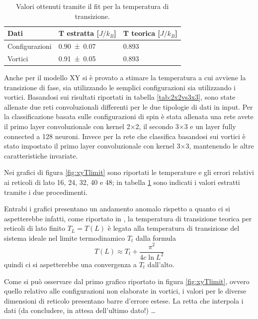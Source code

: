 \documentclass{article}
\begin{document}
\begin{table}[!ht]
\begin{center}
\begin{tabular}{lll}
\toprule
Dati & T estratta [$J/k_B$] & T teorica [$J/k_B$] \\
\midrule
Configurazioni & \num{0.90 \pm 0.07} & \num{0.893}\\
Vortici & \num{0.91 \pm0.05}  & \num{0.893} \\
\bottomrule
\end{tabular}
\end{center}
\caption{Valori ottenuti tramite il fit per la temperatura di transizione.}
\label{tab:Txy}
\end{table}

Anche per il modello XY si è provato a stimare la temperatura a cui avviene la transizione di fase, sia utilizzando le semplici configurazioni sia utilizzando i vortici.
Basandosi sui risultati riportati in tabella \ref{tab:2x2vs3x3}, sono state allenate due reti convoluzionali differenti per le due tipologie di dati in input.
Per la classificazione basata sulle configurazioni di spin è stata allenata una rete avete il primo layer convoluzionale con kernel 2$\times$2, il secondo 3$\times$3 e un layer fully connected a 128 neuroni.
Invece per la rete che classifica basandosi sui vortici è stato impostato il primo layer convoluzionale con kernel 3$\times$3, mantenendo le altre caratteristiche invariate.

Nei grafici di figura \ref{fig:xyTlimit} sono riportati le temperature e gli errori relativi ai reticoli di lato 16, 24, 32, 40 e 48; in tabella \ref{tab:Txy} sono indicati i valori estratti tramite i due procedimenti.

Entrabi i grafici presentano un andamento anomalo rispetto a quanto ci si aspetterebbe infatti, come riportato in \cite{melko}, la temperatura di transizione teorica per reticoli di lato finito $T_L=T(L)$ è legata alla temperatura di transizione del sistema ideale nel limite termodinamico $T_t$ dalla formula
\begin{equation}
T(L) \approx T_t + \frac{\pi^2}{4c \ln{L}^2}
\label{formula:TL}
\end{equation}
quindi ci si aspetterebbe una convergenza a $T_t$ dall'alto.

Come si può osservare dal primo grafico riportato in figura \ref{fig:xyTlimit}, ovvero quello relativo alle configurazioni non elaborate in vortici, i valori per le diverse dimensioni di reticolo presentano barre d'errore estese.
La retta che interpola i dati (da concludere, in attesa dell'ultimo dato!) \dots
\end{document}
